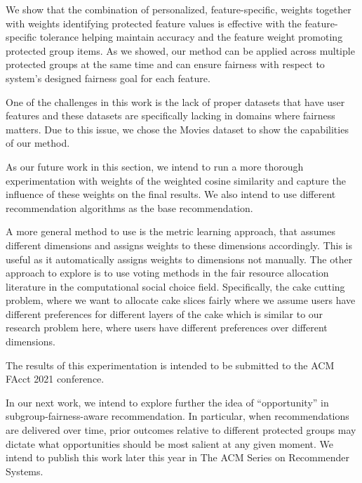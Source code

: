 We show that the combination of personalized, feature-specific, weights together with weights identifying protected feature values is effective with the feature-specific tolerance helping maintain accuracy and the feature weight promoting protected group items. As we showed, our method can be applied across multiple protected groups at the same time and can ensure fairness with respect to system's designed fairness goal for each feature.

One of the challenges in this work is the lack of proper datasets that have user features and these datasets are specifically lacking in domains where fairness matters. Due to this issue, we chose the Movies dataset to show the capabilities of our method.

As our future work in this section, we intend to run a more thorough experimentation with weights of the weighted cosine similarity and capture the influence of these weights on the final results. We also intend to use different recommendation algorithms as the base recommendation.

A more general method to use is the metric learning approach, that assumes different dimensions and assigns weights to these dimensions accordingly. This is useful as it automatically assigns weights to dimensions not manually.
The other approach to explore is to use voting methods in the fair resource allocation literature in the computational social choice field. Specifically, the cake cutting problem, where we want to allocate cake slices fairly where we assume users have different preferences for different layers of the cake which is similar to our research problem here, where users have different preferences over different dimensions.

The results of this experimentation is intended to be submitted to the ACM FAcct 2021 conference.

In our next work, we intend to explore further the idea of ``opportunity'' in subgroup-fairness-aware recommendation. In particular, when recommendations are delivered over time, prior outcomes relative to different protected groups may dictate what opportunities should be most salient at any given moment. We intend to publish this work later this year in The ACM Series on Recommender Systems.